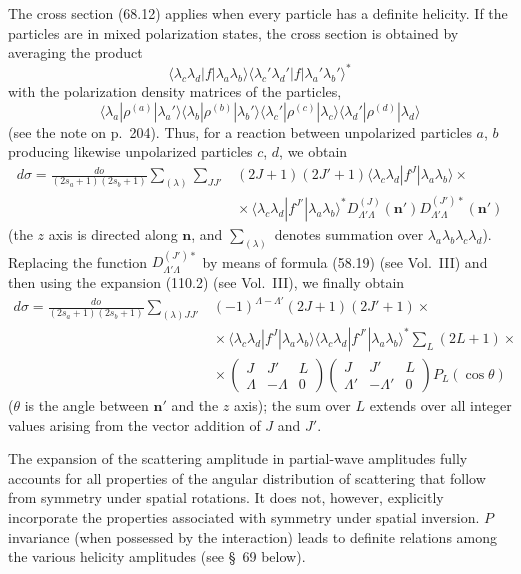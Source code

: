 The cross section (68.12) applies when every particle has a definite helicity. If the particles are in mixed polarization states, the cross section is obtained by averaging the product
\[
\langle\lambda_c\lambda_d|f|\lambda_a\lambda_b\rangle
\langle\lambda_c'\lambda_d'|f|\lambda_a'\lambda_b'\rangle^*
\]
with the polarization density matrices of the particles,
\[
\langle\lambda_a|\rho^{(a)}|\lambda_a'\rangle
\langle\lambda_b|\rho^{(b)}|\lambda_b'\rangle
\langle\lambda_c'|\rho^{(c)}|\lambda_c\rangle
\langle\lambda_d'|\rho^{(d)}|\lambda_d\rangle
\]
(see the note on p.~204). Thus, for a reaction between unpolarized particles $a$, $b$ producing likewise unpolarized
particles $c$, $d$, we obtain
\begin{equation}
\begin{aligned}
d\sigma=\frac{do}{(2s_a+1)(2s_b+1)}
\sum_{(\lambda)}\sum_{JJ'}&(2J+1)(2J'+1)
\langle\lambda_c\lambda_d|f^J|\lambda_a\lambda_b\rangle\times\\
&{}\times
\langle\lambda_c\lambda_d|f^{J'}|\lambda_a\lambda_b\rangle^*
D_{\Lambda'\Lambda}^{(J)}(\mathbf n')
D_{\Lambda'\Lambda}^{(J')*}(\mathbf n')
\end{aligned}
\tag{68.15}
\end{equation}
(the $z$ axis is directed along $\mathbf n$, and $\sum_{(\lambda)}$ denotes summation over $\lambda_a\lambda_b\lambda_c\lambda_d$). Replacing the function $D_{\Lambda'\Lambda}^{(J')*}$ by means of formula (58.19) (see Vol.~III) and then using the expansion (110.2) (see Vol.~III), we finally obtain
\begin{equation}
\begin{aligned}
d\sigma=\frac{do}{(2s_a+1)(2s_b+1)}
\sum_{(\lambda)JJ'}&(-1)^{\Lambda-\Lambda'}(2J+1)(2J'+1)\times\\
&{}\times
\langle\lambda_c\lambda_d|f^J|\lambda_a\lambda_b\rangle
\langle\lambda_c\lambda_d|f^{J'}|\lambda_a\lambda_b\rangle^*
\sum_L(2L+1)\times\\
&{}\times
\begin{pmatrix}J&J'&L\\ \Lambda&-\Lambda&0\end{pmatrix}
\begin{pmatrix}J&J'&L\\ \Lambda'&-\Lambda'&0\end{pmatrix}
P_L(\cos\theta)
\end{aligned}
\tag{68.16}
\end{equation}
($\theta$ is the angle between $\mathbf n'$ and the $z$ axis); the sum over $L$ extends over all integer values arising from the vector addition of $J$ and $J'$.

The expansion of the scattering amplitude in partial-wave amplitudes fully accounts for all properties of the angular distribution of scattering that follow from symmetry under spatial rotations. It does not, however, explicitly incorporate the properties associated with symmetry under spatial inversion. $P$ invariance (when possessed by the interaction) leads to definite relations among the various helicity amplitudes (see \S~69 below).
